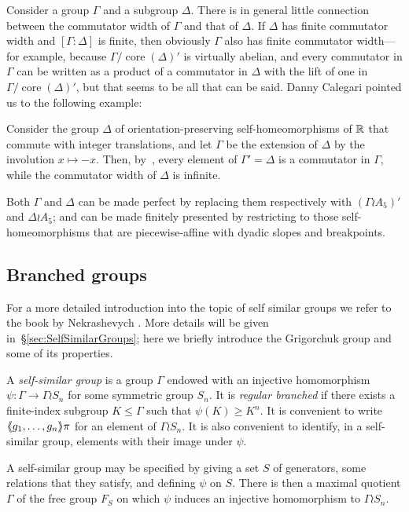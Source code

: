 \documentclass[a4paper,11pt]{amsart}
\begin{document}
Consider a group $\Gamma$ and a subgroup $\Delta$. There is in general
little connection between the commutator width of $\Gamma$ and that of
$\Delta$. If $\Delta$ has finite commutator width and
$[\Gamma:\Delta]$ is finite, then obviously $\Gamma$ also has finite
commutator width---for example, because
$\Gamma/\operatorname{core}(\Delta)'$ is virtually abelian, and every
commutator in $\Gamma$ can be written as a product of a commutator in
$\Delta$ with the lift of one in
$\Gamma/\operatorname{core}(\Delta)'$, but that seems to be all that
can be said. Danny Calegari pointed us to the following example:
\begin{ex}
  Consider the group $\Delta$ of orientation-preserving
  self-homeomorphisms of $\mathbb{R}$ that commute with integer translations,
  and let $\Gamma$ be the extension of $\Delta$ by the involution
  $x\mapsto-x$. Then, by~\cite[Theorems~2.3
  and~2.4]{Eisenbud-Hirsch-Neumann:SeifertBundles}, every element of
  $\Gamma'=\Delta$ is a commutator in $\Gamma$, while the commutator
  width of $\Delta$ is infinite.

  Both $\Gamma$ and $\Delta$ can be made perfect by replacing them
  respectively with $(\Gamma\wr A_5)'$ and $\Delta\wr A_5$; and can be
  made finitely presented by restricting to those self-homeo\-mor\-phisms
  that are piecewise-affine with dyadic slopes and breakpoints.
\end{ex}

\subsection{Branched groups}
For a more detailed introduction into the topic of self similar groups
we refer to the book by Nekrashevych
\cite{Nekrashevych:SelfSimilarGroups}. More details will be given
in~\S\ref{sec:SelfSimilarGroups}; here we briefly introduce
the Grigorchuk group and some of its properties.

A \emph{self-similar group} is a group $\Gamma$ endowed with an
injective homomorphism $\psi\colon\Gamma\to\Gamma\wr S_n$ for some
symmetric group $S_n$. It is \emph{regular branched} if there exists a
finite-index subgroup $K\le\Gamma$ such that $\psi(K)\ge K^n$. It is
convenient to write $\langle\negthickspace\langle g_1,\dots,g_n\rangle\negthickspace\rangle\pi$ for an element of
$\Gamma\wr S_n$. It is also convenient to identify, in a self-similar
group, elements with their image under $\psi$.

A self-similar group may be specified by giving a set $S$ of
generators, some relations that they satisfy, and defining $\psi$ on
$S$. There is then a maximal quotient $\Gamma$ of the free group $F_S$
on which $\psi$ induces an injective homomorphism to $\Gamma\wr S_n$.
\end{document}
